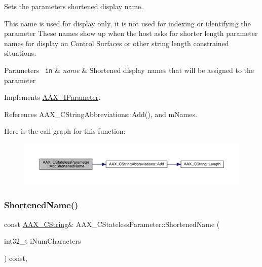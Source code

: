 Sets the parameter\textquotesingle{}s shortened display name. 

This name is used for display only, it is not used for indexing or identifying the parameter These names show up when the host asks for shorter length parameter names for display on Control Surfaces or other string length constrained situations.


\begin{DoxyParams}[1]{Parameters}
\mbox{\texttt{ in}}  & {\em name} & Shortened display names that will be assigned to the parameter \\
\hline
\end{DoxyParams}


Implements \mbox{\hyperlink{a01857_a642ce0054e136c75fe402ebd53a4eb90}{A\+A\+X\+\_\+\+I\+Parameter}}.



References A\+A\+X\+\_\+\+C\+String\+Abbreviations\+::\+Add(), and m\+Names.

Here is the call graph for this function\+:
\nopagebreak
\begin{figure}[H]
\begin{center}
\leavevmode
\includegraphics[width=350pt]{a01541_a332e391a496d741f0f86ee7e46dbe6a4_cgraph}
\end{center}
\end{figure}
\mbox{\label{a01541_a2cf8f9e426e01d3eabea95447e856c23}} 
\subsubsection{\texorpdfstring{ShortenedName()}{ShortenedName()}}
{\footnotesize\ttfamily const \mbox{\hyperlink{a01573}{A\+A\+X\+\_\+\+C\+String}}\& A\+A\+X\+\_\+\+C\+Stateless\+Parameter\+::\+Shortened\+Name (\begin{DoxyParamCaption}\item[{int32\+\_\+t}]{i\+Num\+Characters }\end{DoxyParamCaption}) const\hspace{0.3cm}{\ttfamily [inline]}, {\ttfamily [virtual]}}



